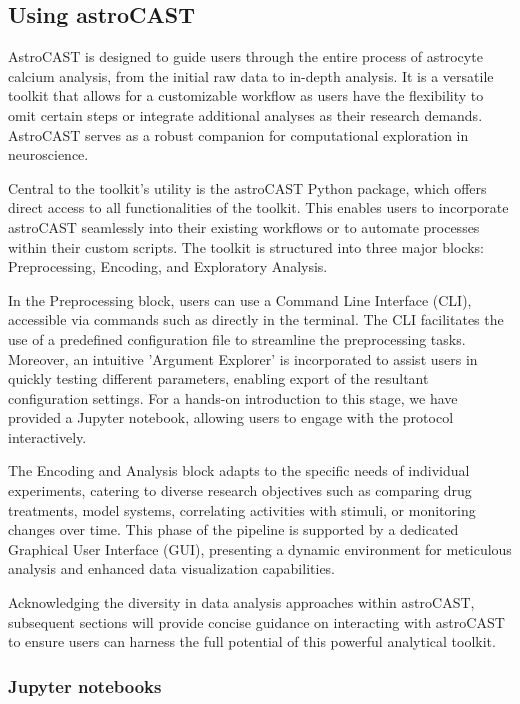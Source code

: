 
\subsection{Using astroCAST}

AstroCAST is designed to guide users through the entire process of astrocyte calcium analysis, from the initial raw data to in-depth analysis. It is a versatile toolkit that allows for a customizable workflow as users have the flexibility to omit certain steps or integrate additional analyses as their research demands. AstroCAST serves as a robust companion for computational exploration in neuroscience.

Central to the toolkit's utility is the astroCAST Python package, which offers direct access to all functionalities of the toolkit. This enables users to incorporate astroCAST seamlessly into their existing workflows or to automate processes within their custom scripts. The toolkit is structured into three major blocks: Preprocessing, Encoding, and Exploratory Analysis.

In the Preprocessing block, users can use a Command Line Interface (CLI), accessible via commands such as  directly in the terminal. The CLI facilitates the use of a predefined configuration file to streamline the preprocessing tasks. Moreover, an intuitive 'Argument Explorer' is incorporated to assist users in quickly testing different parameters, enabling export of the resultant configuration settings. For a hands-on introduction to this stage, we have provided a Jupyter notebook, allowing users to engage with the protocol interactively.

The Encoding and Analysis block adapts to the specific needs of individual experiments, catering to diverse research objectives such as comparing drug treatments, model systems, correlating activities with stimuli, or monitoring changes over time. This phase of the pipeline is supported by a dedicated Graphical User Interface (GUI), presenting a dynamic environment for meticulous analysis and enhanced data visualization capabilities.

Acknowledging the diversity in data analysis approaches within \ac{astroCAST}, subsequent sections will provide concise guidance on interacting with astroCAST to ensure users can harness the full potential of this powerful analytical toolkit.

\subsubsection{Jupyter notebooks}

